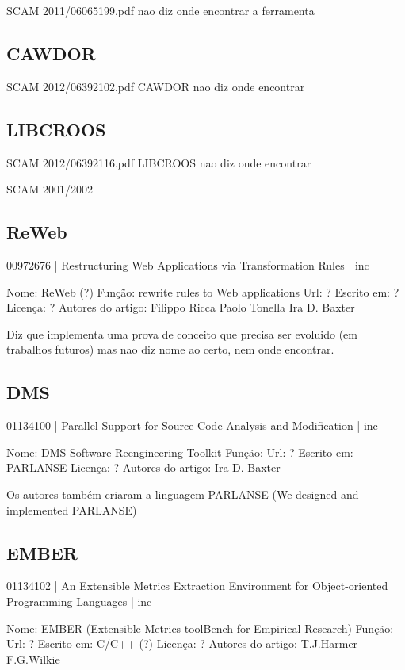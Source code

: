 SCAM 2011/06065199.pdf
 nao diz onde encontrar a ferramenta

\subsection{CAWDOR}

SCAM 2012/06392102.pdf CAWDOR
 nao diz onde encontrar

\subsection{LIBCROOS}

SCAM 2012/06392116.pdf LIBCROOS
 nao diz onde encontrar

SCAM 2001/2002

\subsection{ReWeb}

00972676 | Restructuring Web Applications via Transformation Rules | inc

Nome: ReWeb (?)
Função: rewrite rules to Web applications
Url: ?
Escrito em: ?
Licença: ?
Autores do artigo: Filippo Ricca
                   Paolo Tonella
                   Ira D. Baxter

Diz que implementa uma prova de conceito que precisa ser evoluido (em trabalhos futuros)
mas nao diz nome ao certo, nem onde encontrar.

\subsection{DMS}

01134100 | Parallel Support for Source Code Analysis and Modification | inc

Nome: DMS Software Reengineering Toolkit
Função: 
Url: ?
Escrito em: PARLANSE
Licença: ?
Autores do artigo: Ira D. Baxter

Os autores também criaram a linguagem PARLANSE (We designed and implemented PARLANSE)

\subsection{EMBER}

01134102 | An Extensible Metrics Extraction Environment for Object-oriented Programming Languages | inc

Nome: EMBER (Extensible Metrics toolBench for Empirical Research)
Função: 
Url: ?
Escrito em: C/C++ (?)
Licença: ?
Autores do artigo: T.J.Harmer
                   F.G.Wilkie


